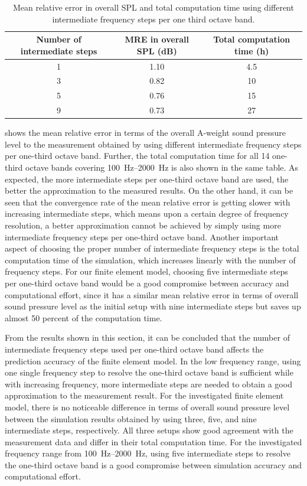 \begin{table}
	\caption{Mean relative error in overall SPL and total computation time using different intermediate frequency steps per one third octave band.}
	\label{tab:freq_steps_MRE}
	\centering
	\begin{tabular}{ccc}
		\toprule
		Number of intermediate steps & MRE in overall SPL (dB) & Total computation time (h) \\ 
		\midrule
		1  & 1.10 & 4.5 \\ 
		3  & 0.82 & 10 \\
		5  & 0.76 & 15 \\
		9  & 0.73 & 27 \\
		\bottomrule
	\end{tabular}
\end{table}

 shows the mean relative error in terms of the overall A-weight sound pressure level to the measurement obtained by using different intermediate frequency steps per one-third octave band. Further, the total computation time for all 14 one-third octave bands covering \SIrange{100}{2000}{\hertz} is also shown in the same table. As expected, the more intermediate steps per one-third octave band are used, the better the approximation to the measured results. On the other hand, it can be seen that the convergence rate of the mean relative error is getting slower with increasing intermediate steps, which means upon a certain degree of frequency resolution, a better approximation cannot be achieved by simply using more intermediate frequency steps per one-third octave band. Another important aspect of choosing the proper number of intermediate frequency steps is the total computation time of the simulation, which increases linearly with the number of frequency steps. For our finite element model, choosing five intermediate steps per one-third octave band would be a good compromise between accuracy and computational effort, since it has a similar mean relative error in terms of overall sound pressure level as the initial setup with nine intermediate steps but saves up almost 50 percent of the computation time.

From the results shown in this section, it can be concluded that the number of intermediate frequency steps used per one-third octave band affects the prediction accuracy of the finite element model. In the low frequency range, using one single frequency step to resolve the one-third octave band is sufficient while with increasing frequency, more intermediate steps are needed to obtain a good approximation to the measurement result. For the investigated finite element model, there is no noticeable difference in terms of overall sound pressure level between the simulation results obtained by using three, five, and nine intermediate steps, respectively. All three setups show good agreement with the measurement data and differ in their total computation time. For the investigated frequency range from \SIrange{100}{2000}{\hertz}, using five intermediate steps to resolve the one-third octave band is a good compromise between simulation accuracy and computational effort.